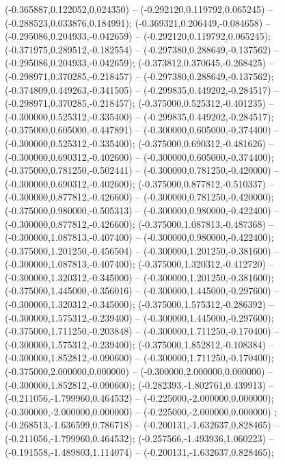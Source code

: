  (-0.365887,0.122052,0.024350) -- (-0.292120,0.119792,0.065245) -- (-0.288523,0.033876,0.184991);
 (-0.369321,0.206449,-0.084658) -- (-0.295086,0.204933,-0.042659) -- (-0.292120,0.119792,0.065245);
 (-0.371975,0.289512,-0.182554) -- (-0.297380,0.288649,-0.137562) -- (-0.295086,0.204933,-0.042659);
 (-0.373812,0.370645,-0.268425) -- (-0.298971,0.370285,-0.218457) -- (-0.297380,0.288649,-0.137562);
 (-0.374809,0.449263,-0.341505) -- (-0.299835,0.449202,-0.284517) -- (-0.298971,0.370285,-0.218457);
 (-0.375000,0.525312,-0.401235) -- (-0.300000,0.525312,-0.335400) -- (-0.299835,0.449202,-0.284517);
 (-0.375000,0.605000,-0.447891) -- (-0.300000,0.605000,-0.374400) -- (-0.300000,0.525312,-0.335400);
 (-0.375000,0.690312,-0.481626) -- (-0.300000,0.690312,-0.402600) -- (-0.300000,0.605000,-0.374400);
 (-0.375000,0.781250,-0.502441) -- (-0.300000,0.781250,-0.420000) -- (-0.300000,0.690312,-0.402600);
 (-0.375000,0.877812,-0.510337) -- (-0.300000,0.877812,-0.426600) -- (-0.300000,0.781250,-0.420000);
 (-0.375000,0.980000,-0.505313) -- (-0.300000,0.980000,-0.422400) -- (-0.300000,0.877812,-0.426600);
 (-0.375000,1.087813,-0.487368) -- (-0.300000,1.087813,-0.407400) -- (-0.300000,0.980000,-0.422400);
 (-0.375000,1.201250,-0.456504) -- (-0.300000,1.201250,-0.381600) -- (-0.300000,1.087813,-0.407400);
 (-0.375000,1.320312,-0.412720) -- (-0.300000,1.320312,-0.345000) -- (-0.300000,1.201250,-0.381600);
 (-0.375000,1.445000,-0.356016) -- (-0.300000,1.445000,-0.297600) -- (-0.300000,1.320312,-0.345000);
 (-0.375000,1.575312,-0.286392) -- (-0.300000,1.575312,-0.239400) -- (-0.300000,1.445000,-0.297600);
 (-0.375000,1.711250,-0.203848) -- (-0.300000,1.711250,-0.170400) -- (-0.300000,1.575312,-0.239400);
 (-0.375000,1.852812,-0.108384) -- (-0.300000,1.852812,-0.090600) -- (-0.300000,1.711250,-0.170400);
 (-0.375000,2.000000,0.000000) -- (-0.300000,2.000000,0.000000) -- (-0.300000,1.852812,-0.090600);
 (-0.282393,-1.802761,0.439913) -- (-0.211056,-1.799960,0.464532) -- (-0.225000,-2.000000,0.000000);
 (-0.300000,-2.000000,0.000000) -- (-0.225000,-2.000000,0.000000) ;
 (-0.268513,-1.636599,0.786718) -- (-0.200131,-1.632637,0.828465) -- (-0.211056,-1.799960,0.464532);
 (-0.257566,-1.493936,1.060223) -- (-0.191558,-1.489803,1.114074) -- (-0.200131,-1.632637,0.828465);

